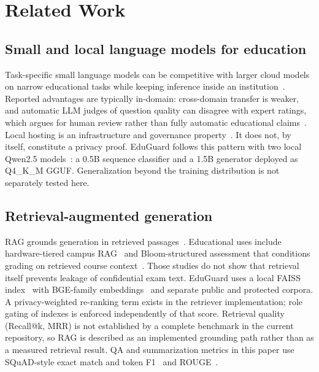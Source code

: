 \documentclass[journal]{IEEEtran}
\begin{document}
\section{Related Work}

\subsection{Small and local language models for education}
Task-specific small language models can be competitive with larger cloud models on narrow educational tasks while keeping inference inside an institution~\cite{slm2026teammates,saur2026grading,tinyllm2024,localai2026}.
Reported advantages are typically in-domain: cross-domain transfer is weaker, and automatic LLM judges of question quality can disagree with expert ratings, which argues for human review rather than fully automatic educational claims~\cite{slm2026teammates,saur2026grading}.
Local hosting is an infrastructure and governance property~\cite{bogicevic2026rag,localai2026}.
It does not, by itself, constitute a privacy proof.
EduGuard follows this pattern with two local Qwen2.5 models~\cite{qwen2024technical}: a 0.5B sequence classifier and a 1.5B generator deployed as Q4\_K\_M GGUF.
Generalization beyond the training distribution is not separately tested here.

\subsection{Retrieval-augmented generation}
RAG grounds generation in retrieved passages~\cite{lewis2020rag}.
Educational uses include hardware-tiered campus RAG~\cite{bogicevic2026rag} and Bloom-structured assessment that conditions grading on retrieved course context~\cite{ragcognitive2025}.
Those studies do not show that retrieval itself prevents leakage of confidential exam text.
EduGuard uses a local FAISS index~\cite{johnson2019faiss} with BGE-family embeddings~\cite{xiao2024bge} and separate public and protected corpora.
A privacy-weighted re-ranking term exists in the retriever implementation; role gating of indexes is enforced independently of that score.
Retrieval quality (Recall@k, MRR) is not established by a complete benchmark in the current repository, so RAG is described as an implemented grounding path rather than as a measured retrieval result.
QA and summarization metrics in this paper use SQuAD-style exact match and token F1~\cite{rajpurkar2016squad} and ROUGE~\cite{lin2004rouge}.
\end{document}
